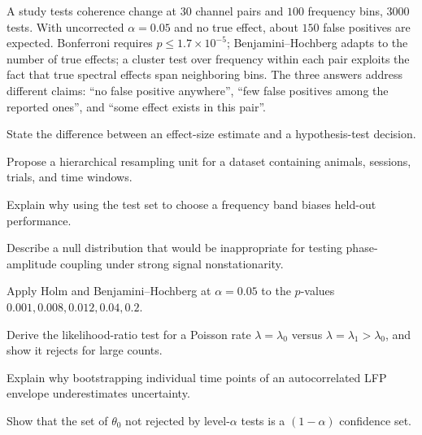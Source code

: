 \begin{workedexample}
A study tests coherence change at $30$ channel pairs and $100$ frequency bins, $3000$ tests. With uncorrected $\alpha=0.05$ and no true effect, about $150$ false positives are expected. Bonferroni requires $p\le1.7\times10^{-5}$; Benjamini--Hochberg adapts to the number of true effects; a cluster test over frequency within each pair exploits the fact that true spectral effects span neighboring bins. The three answers address different claims: ``no false positive anywhere'', ``few false positives among the reported ones'', and ``some effect exists in this pair''.
\end{workedexample}
\begin{exercises}
\item State the difference between an effect-size estimate and a hypothesis-test decision.
\item Propose a hierarchical resampling unit for a dataset containing animals, sessions, trials, and time windows.
\item Explain why using the test set to choose a frequency band biases held-out performance.
\item Describe a null distribution that would be inappropriate for testing phase-amplitude coupling under strong signal nonstationarity.
\item Apply Holm and Benjamini--Hochberg at $\alpha=0.05$ to the $p$-values $0.001,0.008,0.012,0.04,0.2$.
\item Derive the likelihood-ratio test for a Poisson rate $\lambda=\lambda_0$ versus $\lambda=\lambda_1>\lambda_0$, and show it rejects for large counts.
\item Explain why bootstrapping individual time points of an autocorrelated LFP envelope underestimates uncertainty.
\item Show that the set of $\theta_0$ not rejected by level-$\alpha$ tests is a $(1-\alpha)$ confidence set.
\end{exercises}
